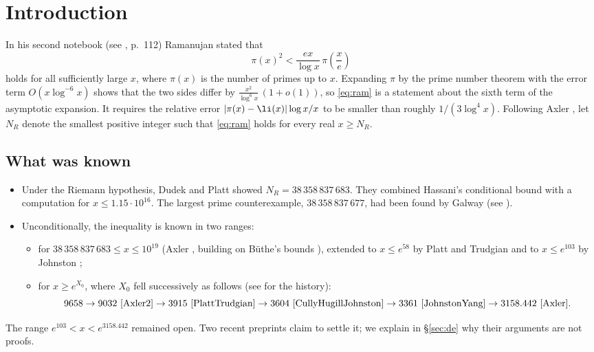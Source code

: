 \section{Introduction}

In his second notebook (see \cite{BerndtIV}, p.~112) Ramanujan stated that
\begin{equation}\label{eq:ram}
\pi(x)^2 < \frac{e x}{\log x}\, \pi\!\left(\frac{x}{e}\right)
\end{equation}
holds for all sufficiently large $x$, where $\pi(x)$ is the number of primes up to $x$.
Expanding $\pi$ by the prime number theorem with the error term $O(x\log^{-6}x)$ shows that the two sides differ by
$\frac{x^2}{\log^6 x}\,(1+o(1))$, so \eqref{eq:ram} is a statement about the sixth term of the asymptotic expansion.
It requires the relative error $|\pi(x)-\li(x)|\log x/x$ to be smaller than roughly $1/(3\log^4 x)$.
Following Axler \cite{Axler}, let $N_R$ denote the smallest positive integer such that \eqref{eq:ram} holds for every real $x \ge N_R$.

\subsection*{What was known}
\begin{itemize}
\item Under the Riemann hypothesis, Dudek and Platt \cite{DudekPlatt} showed $N_R = 38\,358\,837\,683$.
  They combined Hassani's conditional bound \cite{Hassani} with a computation for $x \le 1.15\cdot 10^{16}$.
  The largest prime counterexample, $38\,358\,837\,677$, had been found by Galway (see \cite{DudekPlatt}).
\item Unconditionally, the inequality is known in two ranges:
  \begin{itemize}
  \item for $38\,358\,837\,683 \le x \le 10^{19}$ (Axler \cite{Axler2}, building on B\"uthe's bounds \cite{Buthe2018}), extended to $x\le e^{58}$ by Platt and Trudgian \cite{PlattTrudgian} and to $x \le e^{103}$ by Johnston \cite[Thm.~5.1]{Johnston};
  \item for $x \ge e^{X_0}$, where $X_0$ fell successively as follows (see \cite{Axler} for the history):
  \[
  9658 \to 9032\ \text{\cite{Axler2}} \to 3915\ \text{\cite{PlattTrudgian}} \to 3604\ \text{\cite{CullyHugillJohnston}} \to 3361\ \text{\cite{JohnstonYang}} \to 3158.442\ \text{\cite{Axler}}.
  \]
  \end{itemize}
\end{itemize}
The range $e^{103} < x < e^{3158.442}$ remained open.
Two recent preprints \cite{De1,De2} claim to settle it; we explain in \S\ref{sec:de} why their arguments are not proofs.


